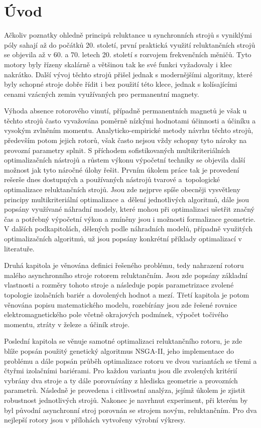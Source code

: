 \chapter*{Úvod}

\noindent Ačkoliv poznatky ohledně principů reluktance u synchronních strojů s vyniklými póly sahají až do počátků 20. století, první praktická využití reluktančních strojů se objevila až v 60. a 70. letech 20. století s rozvojem frekvenčních měničů. Tyto motory byly řízeny skalárně a většinou tak ke své funkci vyžadovaly i klec nakrátko. Další vývoj těchto strojů přišel jednak s modernějšími algoritmy, které byly schopné stroje dobře řídit i bez použití této klece, jednak s kolísajícími cenami vzácných zemin využívaných pro permanentní magnety. \cite{redisc}

Výhoda absence rotorového vinutí, případně permanentních magnetů je však u těchto strojů často vyvažována poměrně nízkými hodnotami účinnosti a účiníku a vysokým zvlněním momentu. Analyticko-empirické metody návrhu těchto strojů, především potom jejich rotorů, však často nejsou vždy schopny tyto nároky na provozní parametry splnit. S příchodem sofistikovaných multikriteriálních optimalizačních nástrojů a růstem výkonu výpočetní techniky se objevila další možnost jak tyto náročné úlohy řešit. Prvním úkolem práce tak je provedení rešerše dnes dostupných a používaných nástrojů tvarové a~topologické optimalizace reluktančních strojů. Jsou zde nejprve spíše obecněji vysvětleny principy multikriteriální optimalizace a~dělení jednotlivých algoritmů, dále jsou popsány využívané náhradní modely, které mohou při optimalizaci ušetřit značný čas a potřebný výpočetní výkon a zmíněny jsou i možnosti formalizace geometrie. V dalších podkapitolách, dělených podle náhradních modelů, případně využitých optimalizačních algoritmů, už jsou popsány konkrétní příklady optimalizací v literatuře.

Druhá kapitola je věnována definici řešeného problému, tedy nahrazení rotoru malého asynchronního stroje rotorem reluktančním. Jsou zde popsány základní vlastnosti a rozměry tohoto stroje a následuje popis parametrizace zvolené topologie izolačních bariér a dovolených hodnot a mezí. Třetí kapitola je potom věnována popisu matematického modelu, rozebírány jsou zde řešené rovnice elektromagnetického pole včetně okrajových podmínek, výpočet točivého momentu, ztráty v železe a účiník stroje.

Poslední kapitola se věnuje samotné optimalizaci reluktančního rotoru, je zde blíže popsán použitý genetický algoritmus NSGA-II, jeho implementace do problému a dále popsán průběh optimalizace rotoru ve dvou variantách se třemi a čtyřmi izolačními bariérami. Pro každou variantu jsou dle zvolených kritérií vybrány dva stroje a ty dále porovnávány z hlediska geometrie a provozních parametrů. Následně je provedena i citlivostní analýza, jejímž úkolem je zjistit robustnost jednotlivých strojů. Nakonec je navrhnut experiment, při kterém by byl původní asynchronní stroj porovnán se strojem novým, reluktančním. Pro dva nejlepší rotory jsou v přílohách vytvořeny výrobní výkresy.
